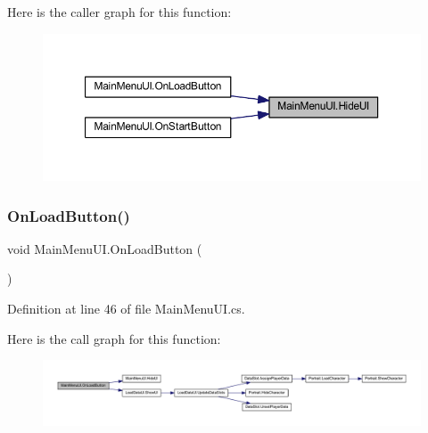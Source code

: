 Here is the caller graph for this function\+:
\nopagebreak
\begin{figure}[H]
\begin{center}
\leavevmode
\includegraphics[width=350pt]{class_main_menu_u_i_a880a33ba6d600fee9ee4635b94bded8c_icgraph}
\end{center}
\end{figure}
\mbox{\label{class_main_menu_u_i_ab97fc6c28c9bfe985c650c7572aec0fc}} 
\subsubsection{\texorpdfstring{OnLoadButton()}{OnLoadButton()}}
{\footnotesize\ttfamily void Main\+Menu\+U\+I.\+On\+Load\+Button (\begin{DoxyParamCaption}{ }\end{DoxyParamCaption})}



Definition at line 46 of file Main\+Menu\+U\+I.\+cs.

Here is the call graph for this function\+:
\nopagebreak
\begin{figure}[H]
\begin{center}
\leavevmode
\includegraphics[width=350pt]{class_main_menu_u_i_ab97fc6c28c9bfe985c650c7572aec0fc_cgraph}
\end{center}
\end{figure}
\mbox{\label{class_main_menu_u_i_ac567ba394028f00989750f4782325daf}} 
